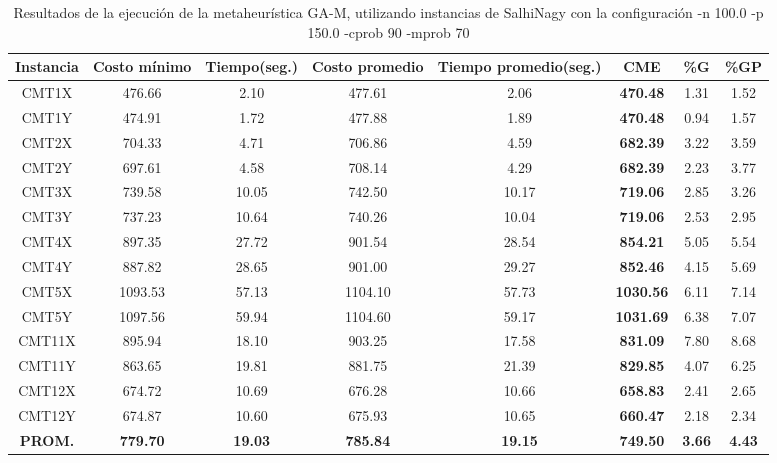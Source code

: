 \begin{table}[h]
\caption{Resultados de la ejecución de la metaheurística GA-M, utilizando instancias de SalhiNagy con la configuración -n 100.0 -p 150.0 -cprob 90 -mprob 70}
\centering
\small
\begin{tabular}{c c c c c c c c}
\hline\hline
Instancia & Costo mínimo & Tiempo(seg.) & Costo promedio & Tiempo promedio(seg.) & CME & \%G & \%GP \\ [0.5ex]
\hline
CMT1X & 476.66 & 2.10 & 
477.61 & 2.06 & \bf{470.48} & 
1.31 & 1.52\\CMT1Y & 474.91 & 1.72 & 
477.88 & 1.89 & \bf{470.48} & 
0.94 & 1.57\\CMT2X & 704.33 & 4.71 & 
706.86 & 4.59 & \bf{682.39} & 
3.22 & 3.59\\CMT2Y & 697.61 & 4.58 & 
708.14 & 4.29 & \bf{682.39} & 
2.23 & 3.77\\CMT3X & 739.58 & 10.05 & 
742.50 & 10.17 & \bf{719.06} & 
2.85 & 3.26\\CMT3Y & 737.23 & 10.64 & 
740.26 & 10.04 & \bf{719.06} & 
2.53 & 2.95\\CMT4X & 897.35 & 27.72 & 
901.54 & 28.54 & \bf{854.21} & 
5.05 & 5.54\\CMT4Y & 887.82 & 28.65 & 
901.00 & 29.27 & \bf{852.46} & 
4.15 & 5.69\\CMT5X & 1093.53 & 57.13 & 
1104.10 & 57.73 & \bf{1030.56} & 
6.11 & 7.14\\CMT5Y & 1097.56 & 59.94 & 
1104.60 & 59.17 & \bf{1031.69} & 
6.38 & 7.07\\CMT11X & 895.94 & 18.10 & 
903.25 & 17.58 & \bf{831.09} & 
7.80 & 8.68\\CMT11Y & 863.65 & 19.81 & 
881.75 & 21.39 & \bf{829.85} & 
4.07 & 6.25\\CMT12X & 674.72 & 10.69 & 
676.28 & 10.66 & \bf{658.83} & 
2.41 & 2.65\\CMT12Y & 674.87 & 10.60 & 
675.93 & 10.65 & \bf{660.47} & 
2.18 & 2.34\\\bf{PROM.} & 
\bf{779.70} & \bf{19.03} & \bf{785.84} & \bf{19.15} & \bf{749.50} & \bf{3.66} & \bf{4.43}\\[1ex]\hline
\end{tabular}
\label{table:nonlin}
\end{table} 

